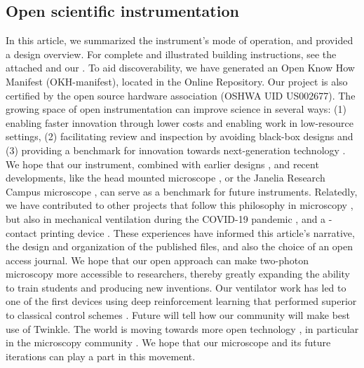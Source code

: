 \documentclass[10pt,letterpaper]{article}
\begin{document}
\subsection*{Open scientific instrumentation}
In this article, we summarized the instrument's mode of operation, and provided a design overview. For complete and illustrated building instructions, see the attached  and our . To aid discoverability, we have generated an Open Know How Manifest (OKH-manifest), located in the Online Repository. Our project is also certified by the open source hardware association (OSHWA UID US002677).\newline
The growing space of open instrumentation can improve science in several ways: (1) enabling faster innovation through lower costs and enabling work in low-resource settings, (2) facilitating review and inspection by avoiding black-box designs and (3) providing a benchmark for innovation towards next-generation technology \cite{Lees2024}. We hope that our instrument, combined with earlier designs \cite{Rosenegger2014, Mayrhofer2015, Tan1999}, and recent developments, like the head mounted microscope \cite{Zong2022}, or the Janelia Research Campus microscope \cite{Janelia2024}, can serve as a benchmark for future instruments. Relatedly, we have contributed to other projects that follow this philosophy in microscopy \cite{Scott2018}, but also in mechanical ventilation during the COVID-19 pandemic \cite{LaChance2022,POVMC2022}, and a \textmu-contact printing device \cite{Samhaber2016}. These experiences have informed this article's narrative, the design and organization of the published files, and also the choice of an open access journal. We hope that our open approach can make two-photon microscopy more accessible to researchers, thereby greatly expanding the ability to train students and producing new inventions. Our ventilator work has led to one of the first devices using deep reinforcement learning that performed superior to classical control schemes \cite{Suo2021}. Future will tell how our community will make best use of Twinkle. The world is moving towards more open technology \cite{Schottdorf2024}, in particular in the microscopy community \cite{Hohlbein2022}. We hope that our microscope and its future iterations can play a part in this movement.
\end{document}
